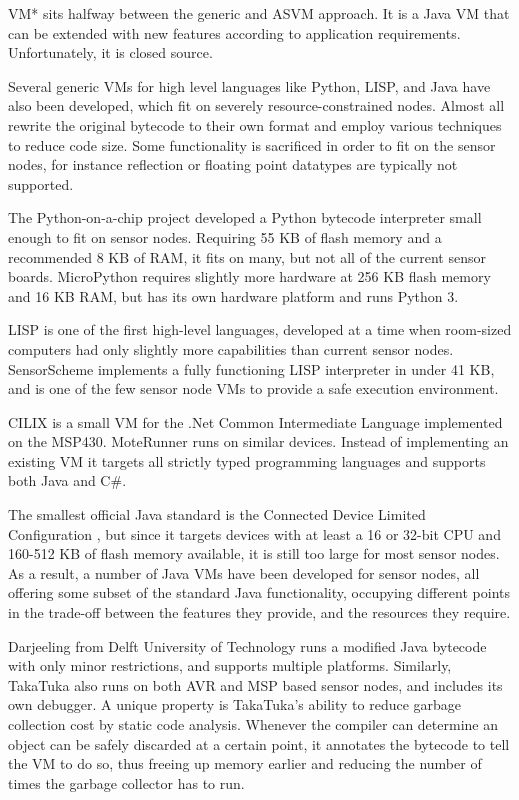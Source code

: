 VM* \cite{Koshy:2005ww} sits halfway between the generic and ASVM approach. It is a Java VM that can be extended with new features according to application requirements. Unfortunately, it is closed source.

Several generic VMs for high level languages like Python, LISP, and Java have also been developed, which fit on severely resource-constrained nodes. Almost all rewrite the original bytecode to their own format and employ various techniques to reduce code size. Some functionality is sacrificed in order to fit on the sensor nodes, for instance reflection or floating point datatypes are typically not supported.

The Python-on-a-chip project \cite{python-on-a-chip} developed a Python bytecode interpreter small enough to fit on sensor nodes. Requiring 55 KB of flash memory and a recommended 8 KB of RAM, it fits on many, but not all of the current sensor boards. MicroPython \cite{micropython} requires slightly more hardware at 256 KB flash memory and 16 KB RAM, but has its own hardware platform and runs Python 3.

LISP is one of the first high-level languages, developed at a time when room-sized computers had only slightly more capabilities than current sensor nodes. SensorScheme \cite{Evers:2010ur} implements a fully functioning LISP interpreter in under 41 KB, and is one of the few sensor node VMs to provide a safe execution environment.

CILIX \cite{Kishino:2010} is a small VM for the .Net Common Intermediate Language implemented on the MSP430. MoteRunner \cite{Caracas:2009} runs on similar devices. Instead of implementing an existing VM it targets all strictly typed programming languages and supports both Java and C\#.

The smallest official Java standard is the Connected Device Limited Configuration \cite{CLDC}, but since it targets devices with at least a 16 or 32-bit CPU and 160-512 KB of flash memory available, it is still too large for most sensor nodes. As a result, a number of Java VMs have been developed for sensor nodes, all offering some subset of the standard Java functionality, occupying different points in the trade-off between the features they provide, and the resources they require.

Darjeeling \cite{Brouwers:2009cj} from Delft University of Technology runs a modified Java bytecode with only minor restrictions, and supports multiple platforms. Similarly, TakaTuka \cite{Aslam:2008} also runs on both AVR and MSP based sensor nodes, and includes its own debugger. A unique property is TakaTuka's ability to reduce garbage collection cost by static code analysis. Whenever the compiler can determine an object can be safely discarded at a certain point, it annotates the bytecode to tell the VM to do so, thus freeing up memory earlier and reducing the number of times the garbage collector has to run. 

